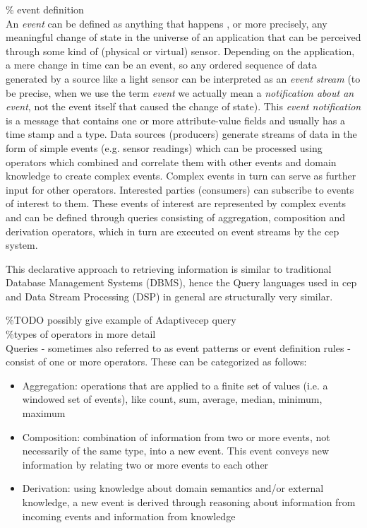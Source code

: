 \% event definition \\ 
An \textit{event} can be defined as anything that happens \cite{Chandy2011}, or more precisely, any meaningful change of state in the universe of an application that can be perceived through some kind of (physical or virtual) sensor. Depending on the application, a mere change in time can be an event, so any ordered sequence of data generated by a source like a light sensor can be interpreted as an \textit{event stream} (to be precise, when we use the term \textit{event} we actually mean a \textit{notification about an event}, not the event itself that caused the change of state). This \textit{event notification} is a message that contains one or more attribute-value fields and usually has a time stamp and a type.
Data sources (producers) generate streams of data in the form of simple events (e.g. sensor readings) which can be processed using operators which combined and correlate them with other events and domain knowledge to create complex events. Complex events in turn can serve as further input for other operators.
Interested parties (consumers) can subscribe to events of interest to them. These events of interest are represented by complex events and can be defined through queries consisting of aggregation, composition and derivation operators, which in turn are executed on event streams by the \gls{cep} system.

This declarative approach to retrieving information is similar to traditional Database Management Systems (DBMS), hence the Query languages used in \gls{cep} and Data Stream Processing (DSP) in general are structurally very similar. 

\%TODO possibly give example of Adaptive\gls{cep} query \\



\%types of operators in more detail \\
Queries - sometimes also referred to as event patterns \cite{Luckham2011a} or event definition rules \cite{Cugola2013} - consist of one or more operators. These can be categorized as follows:
\begin{itemize}
\item Aggregation: operations that are applied to a finite set of values (i.e. a windowed set of events), like count, sum, average, median, minimum, maximum
\item Composition: combination of information from two or more events, not necessarily of the same type, into a new event. This event conveys new information by relating two or more events to each other
\item Derivation: using knowledge about domain semantics and/or external knowledge, a new event is derived through reasoning about information from incoming events and information from knowledge
\end{itemize}


